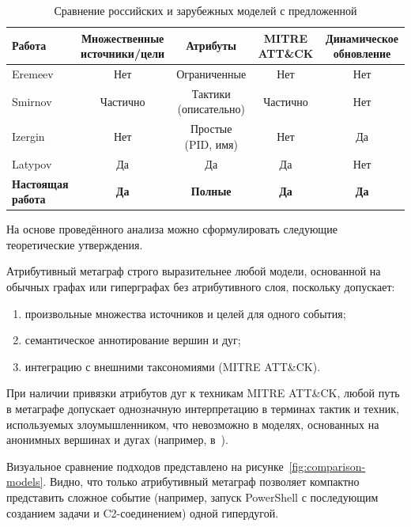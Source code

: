 \documentclass{article}
\begin{document}
\begin{table}[h]
    \centering
    \caption{Сравнение российских и зарубежных моделей с предложенной}
    \label{tab:russian_comparison}
    \begin{tabular}{lcccc}
        \toprule
        Работа & Множественные источники/цели & Атрибуты & MITRE ATT\&CK & Динамическое обновление \\
        \midrule
        Eremeev~\cite{Eremeev2003} & Нет & Ограниченные & Нет & Нет \\
        Smirnov~\cite{Smirnov2022} & Частично & Тактики (описательно) & Частично & Нет \\
        Izergin~\cite{Izergin2024} & Нет & Простые (PID, имя) & Нет & Да \\
        Latypov~\cite{Latypov2020} & Да & Да & Да & Нет \\
        \textbf{Настоящая работа} & \textbf{Да} & \textbf{Полные} & \textbf{Да} & \textbf{Да} \\
        \bottomrule
    \end{tabular}
\end{table}

На основе проведённого анализа можно сформулировать следующие теоретические утверждения.

\begin{theorem}
    Атрибутивный метаграф строго выразительнее любой модели, основанной на обычных графах или гиперграфах без атрибутивного слоя, поскольку допускает:
    \begin{enumerate}
        \item произвольные множества источников и целей для одного события;
        \item семантическое аннотирование вершин и дуг;
        \item интеграцию с внешними таксономиями (MITRE ATT\&CK).
    \end{enumerate}
\end{theorem}

\begin{theorem}[Об интерпретируемости]
    При наличии привязки атрибутов дуг к техникам MITRE ATT\&CK, любой путь в метаграфе допускает однозначную интерпретацию в терминах тактик и техник, используемых злоумышленником, что невозможно в моделях, основанных на анонимных вершинах и дугах (например, в~\cite{Izergin2024,Ying2019}).
\end{theorem}

Визуальное сравнение подходов представлено на рисунке~\ref{fig:comparison-models}. Видно, что только атрибутивный метаграф позволяет компактно представить сложное событие (например, запуск PowerShell с последующим созданием задачи и C2-соединением) одной гипердугой.
\end{document}
